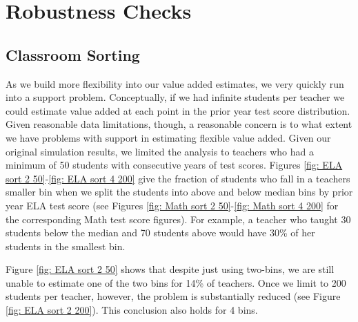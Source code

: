 \documentclass[letterpaper,12pt]{article}
\begin{document}
\section{Robustness Checks}\label{sec: Robust}

\subsection{Classroom Sorting}

As we build more flexibility into our value added estimates, we very quickly run into a support problem. Conceptually, if we had infinite students per teacher we could estimate value added at each point in the prior year test score distribution. Given reasonable data limitations, though, a reasonable concern is to what extent we have problems with support in estimating flexible value added. Given our original simulation results, we limited the analysis to teachers who had a minimum of 50 students with consecutive years of test scores. Figures \ref{fig: ELA sort 2 50}-\ref{fig: ELA sort 4 200} give the fraction of students who fall in a teachers smaller bin when we split the students into above and below median bins by prior year ELA test score (see Figures \ref{fig: Math sort 2 50}-\ref{fig: Math sort 4 200} for the corresponding Math test score figures). For example, a teacher who taught 30 students below the median and 70 students above would have 30\% of her students in the smallest bin.

Figure \ref{fig: ELA sort 2 50} shows that despite just using two-bins, we are still unable to estimate one of the two bins for 14\% of teachers. Once we limit to 200 students per teacher, however, the problem is substantially reduced (see Figure \ref{fig: ELA sort 2 200}). This conclusion also holds for 4 bins.
\end{document}
